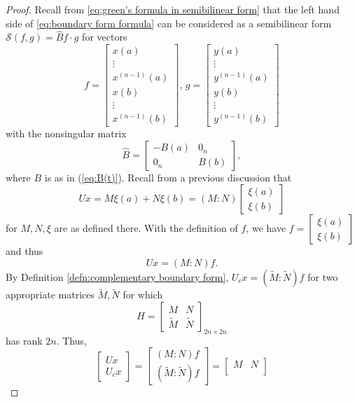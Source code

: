 \documentclass[11pt, oneside, a4paper]{article}
\begin{document}
\begin{proof}
    Recall from \eqref{eq:green's formula in semibilinear form} that the left hand side of \eqref{eq:boundary form formula} can be considered as a semibilinear form $\mathcal{S}(f,g)=\hat{B}f\cdot g$ for vectors
    \[
        f=
        \begin{bmatrix}
            x(a)\\
            \vdots\\
            x^{(n-1)}(a)\\
            x(b)\\
            \vdots\\
            x^{(n-1)}(b)
        \end{bmatrix},\,
        g=
        \begin{bmatrix}
            y(a)\\
            \vdots\\
            y^{(n-1)}(a)\\
            y(b)\\
            \vdots\\
            y^{(n-1)}(b)
        \end{bmatrix}
    \]
    with the nonsingular matrix
    \[
        \hat{B}=
        \begin{bmatrix}
            -B(a) & 0_n\\
            0_n & B(b)
        \end{bmatrix},
    \]
    where $B$ is as in (\ref{eq:B(t)}).
    Recall from a previous discussion that 
    \[Ux = M\xi(a) + N\xi(b) = (M:N)\begin{bmatrix}\xi(a)\\ \xi(b)\end{bmatrix}\]
    for $M, N, \xi$ are as defined there. With the definition of $f$, we have $f=\begin{bmatrix}\xi(a)\\ \xi(b)\end{bmatrix}$ and thus
    \[Ux = (M:N)f.\]
    By Definition \ref{defn:complementary boundary form}, $U_c x = (\tilde{M}:\tilde{N})f$ for two appropriate matrices $\tilde{M}, \tilde{N}$ for which
    \[H = \begin{bmatrix}M & N\\
    \tilde{M} & \tilde{N}\end{bmatrix}_{2n\times 2n}\]
    has rank $2n$. Thus,
    \[\begin{bmatrix}Ux\\ U_cx\end{bmatrix} = \begin{bmatrix}(M:N)f\\(\tilde{M}:\tilde{N})f\end{bmatrix} = \begin{bmatrix}M & N\\

\end{bmatrix}\]
\end{proof}
\end{document}
